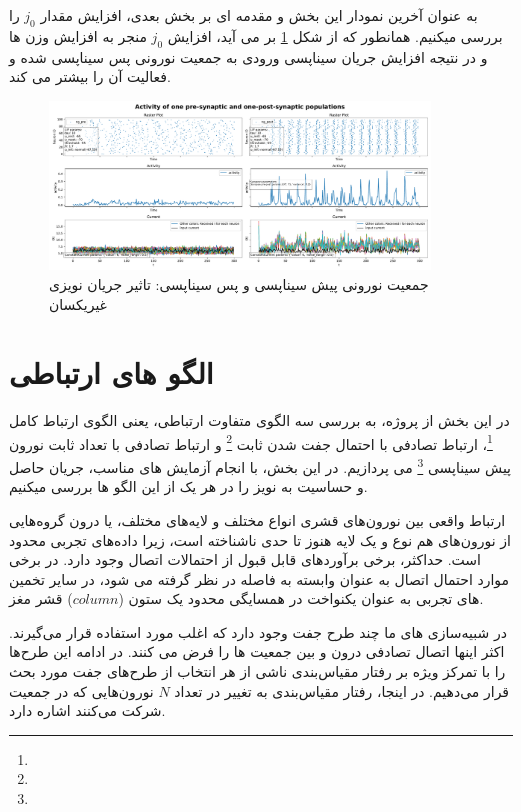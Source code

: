 \documentclass{report}
\begin{document}
        به عنوان آخرین نمودار این بخش و مقدمه ای بر بخش بعدی، افزایش مقدار 
        $j_0$ 
        را بررسی میکنیم. همانطور که از شکل 
        \ref{fig:part1-two-ng-with-synapse-high-diff-curr-high-j}
        بر می آید، افزایش 
        $j_0$ 
        منجر به افزایش وزن ها و در نتیجه افزایش جریان سیناپسی ورودی به جمعیت نورونی پس سیناپسی شده و فعالیت آن را بیشتر می کند.
        \begin{figure}[!ht]
            \centering
            \includegraphics[width=0.9\textwidth]{plots/part1-two-ng-with-synapse-high-diff-curr-high-j.pdf} 
            \caption{جمعیت نورونی پیش سیناپسی و پس سیناپسی: تاثیر جریان نویزی غیریکسان}
            \label{fig:part1-two-ng-with-synapse-high-diff-curr-high-j}
        \end{figure}

\newpage
\section{الگو های ارتباطی}
    در این بخش از پروژه، به بررسی سه الگوی متفاوت ارتباطی، یعنی الگوی ارتباط کامل
    \footnote{}، 
    ارتباط تصادفی با احتمال جفت شدن ثابت
    \footnote{}
    و ارتباط تصادفی با تعداد ثابت نورون پیش سیناپسی
    \footnote{}
    می پردازیم. در این بخش، با انجام آزمایش های مناسب، جریان حاصل و حساسیت به نویز را در هر یک از این الگو ها بررسی میکنیم.

    ارتباط واقعی بین نورون‌های قشری انواع مختلف و لایه‌های مختلف، یا درون گروه‌هایی از نورون‌های هم نوع و یک لایه هنوز تا حدی ناشناخته است، زیرا داده‌های تجربی محدود است. حداکثر، برخی برآوردهای قابل قبول از احتمالات اتصال وجود دارد. در برخی موارد احتمال اتصال به عنوان وابسته به فاصله در نظر گرفته می شود، در سایر تخمین های تجربی به عنوان یکنواخت در همسایگی محدود یک ستون
    ($column$)
    قشر مغز.

    در شبیه‌سازی های ما چند طرح جفت وجود دارد که اغلب مورد استفاده قرار می‌گیرند. اکثر اینها اتصال تصادفی درون و بین جمعیت ها را فرض می کنند. در ادامه این طرح‌ها را با تمرکز ویژه بر رفتار مقیاس‌بندی ناشی از هر انتخاب از طرح‌های جفت مورد بحث قرار می‌دهیم. در اینجا، رفتار مقیاس‌بندی به تغییر در تعداد 
    $N$
    نورون‌هایی که در جمعیت شرکت می‌کنند اشاره دارد.
    \cite{Neuronal-Dynamics}
\end{document}

